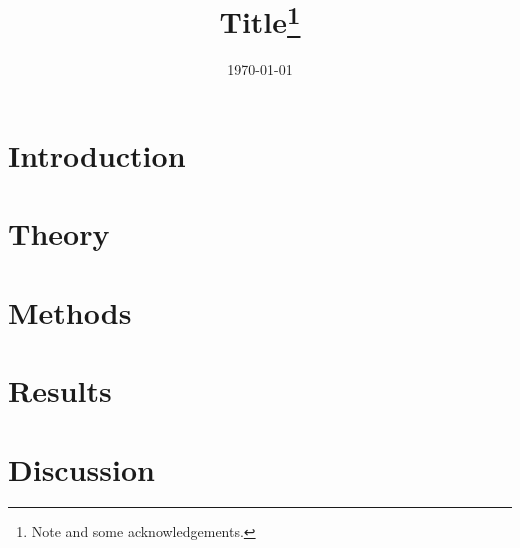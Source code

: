 \documentclass[12pt,halfline,a4paper]{ouparticle}
\begin{document}
\title{Title\thanks{Note and some acknowledgements.}}

\author{%
\address{Affiliation}
}

\abstract{}

\date{\today}

\keywords{}

\maketitle

\section{Introduction}
\label{sec1}

\section{Theory}
\label{sec2}

\section{Methods}
\label{sec3}

\section{Results}
\label{sec4}

\section{Discussion}
\label{sec5}

\end{document}

